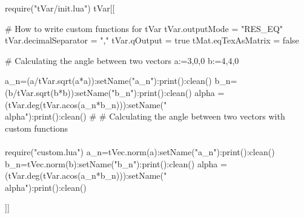\documentclass{article}
\begin{document}
\begin{luacode}
require("tVar/init.lua")
tVar[[

# How to write custom functions for tVar
tVar.outputMode = "RES_EQ"
tVar.decimalSeparator = ","
tVar.qOutput = true
tMat.eqTexAsMatrix = false

# Calculating the angle between two vectors
a:={3,0,0}
b:={4,4,0}

a_n=(a/tVar.sqrt(a*a)):setName("a_n"):print():clean()
b_n=(b/tVar.sqrt(b*b)):setName("b_n"):print():clean()
alpha = (tVar.deg(tVar.acos(a_n*b_n))):setName("\\alpha"):print():clean()
# 
# Calculating the angle between two vectors with custom functions\\\\
require("custom.lua")
a_n=tVec.norm(a):setName("a_n"):print():clean()
b_n=tVec.norm(b):setName("b_n"):print():clean()
alpha = (tVar.deg(tVar.acos(a_n*b_n))):setName("\\alpha"):print():clean()

]]	
\end{luacode}
\end{document}
